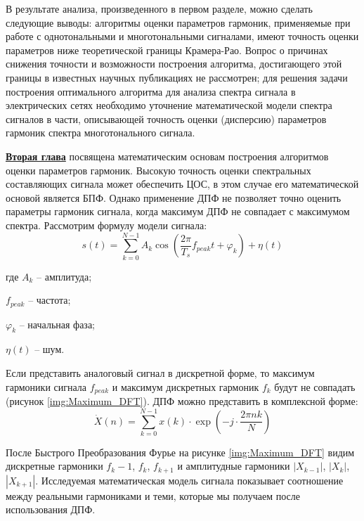 В результате анализа, произведенного в первом разделе, можно сделать следующие выводы:
алгоритмы оценки параметров гармоник, применяемые при работе с однотональными и многотональными сигналами, имеют точность оценки параметров ниже теоретической границы Крамера-Рао. Вопрос о причинах снижения точности и возможности построения алгоритма, достигающего этой границы в известных научных публикациях не рассмотрен; 
для решения задачи построения оптимального алгоритма для анализа спектра сигнала в электрических сетях необходимо уточнение математической модели спектра сигналов в части, описывающей точность оценки (дисперсию) параметров гармоник спектра многотонального сигнала. 

\underline{\textbf{Вторая глава}} посвящена математическим основам построения алгоритмов оценки параметров гармоник.
Высокую точность оценки спектральных составляющих сигнала может
обеспечить ЦОС, в этом случае его математической
основой является БПФ. Однако применение ДПФ не позволяет точно оценить параметры гармоник сигнала, когда
максимум ДПФ не совпадает с максимумом спектра. Рассмотрим формулу модели сигнала:	
\begin{equation}
	\label{eq:equation3}
	s(t) = \displaystyle\sum_{k=0}^{N-1} A_k \cos \left({\frac{2 \pi}{T_s} f_{peak} t  + \varphi_k} \right)+ \eta(t)  
\end{equation}

где $A_k$ -- амплитуда;

$f_{peak}$ -- частота;

$\varphi_k$ -- начальная фаза;

$\eta(t)$ -- шум. 

Если представить аналоговый сигнал в дискретной форме, то 
максимум гармоники сигнала $f_{peak}$ и максимум дискретных гармоник $f_k$ будут не совпадать (рисунок \ref{img:Maximum_DFT}). ДПФ можно представить в комплексной форме:
\begin{equation}
	\label{eq:equation4}
	\dot{X}(n)= \displaystyle\sum_{k=0}^{N-1} x(k) \cdot \exp\left( -j \cdot \frac{2 \pi n k}{N}\right)
\end{equation}  

После Быстрого Преобразования Фурье на рисунке \ref{img:Maximum_DFT} видим дискретные гармоники $f_k-1$, $f_k$, $f_{k+1}$ и амплитудные гармоники $|X_{k-1}|$, $|X_k|$, $|X_{k+1}|$. Исследуемая математическая модель сигнала показывает соотношение между реальными гармониками и теми, которые мы получаем после использования ДПФ. 

